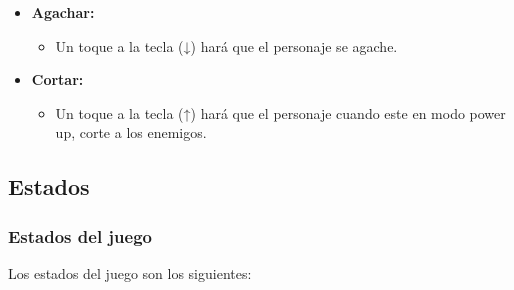\documentclass[palatino]{apuntes}
\begin{document}
\begin{itemize}
    \item \textbf{Agachar:}
        \begin{itemize}
            \item Un toque a la tecla (↓) hará que el personaje se agache.
        \end{itemize}
    
\end{itemize}

\begin{itemize}
    \item \textbf{Cortar:}
        \begin{itemize}
            \item Un toque a la tecla (↑) hará que el personaje cuando este en modo power up, corte a los enemigos.
        \end{itemize}
    
\end{itemize}


\subsection{Estados}

\subsubsection{Estados del juego}
Los estados del juego son los siguientes:
\end{document}
